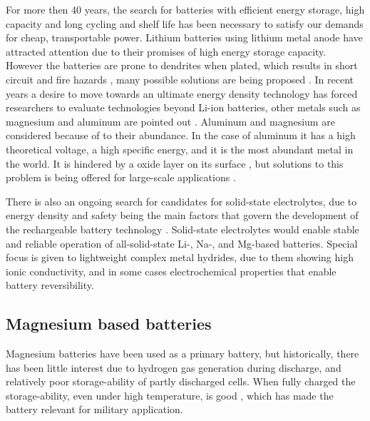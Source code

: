 For more then 40 years, the search for batteries with efficient energy storage, high capacity and long cycling and shelf life has been necessary to satisfy our demands for cheap, transportable power. Lithium batteries using lithium metal anode have attracted attention due to their promises of high energy storage capacity. However the batteries are prone to dendrites when plated, which results in short circuit and fire hazards \cite{xu2004nonaqueous}\cite{kim2013metallic}, many possible solutions are being proposed \cite{liu2016lithium} \cite{zhang2015ex} \cite{li2018self} \cite{lee2017suppressing}. In recent years a desire to move towards an ultimate energy density technology has forced researchers to evaluate technologies beyond Li-ion batteries, other metals such as magnesium and aluminum are pointed out \cite{reddy2011linden} \cite{yoo2013mg}. Aluminum and magnesium are considered because of to their abundance. In the case of aluminum it has a high theoretical voltage, a high specific energy, and it is the most abundant metal in the world. It is hindered by a oxide layer on its surface \cite{li2002aluminum}, but solutions to this problem is being offered for large-scale applications \cite{van2014rechargeable}. 

There is also an ongoing search for candidates for solid-state electrolytes, due to energy density and safety being the main factors that govern the development of the rechargeable battery technology \cite{guzik2019lightweight}. Solid-state electrolytes would enable stable and reliable operation of all-solid-state Li-, Na-, and Mg-based batteries. Special focus is given to lightweight complex metal hydrides, due to them showing high ionic conductivity, and in some cases electrochemical properties that enable battery reversibility. 


\subsection{Magnesium based batteries}
	
	Magnesium batteries have been used as a primary battery, but historically, there has been little interest due to hydrogen gas generation during discharge, and relatively poor storage-ability of partly discharged cells. When fully charged the storage-ability, even under high temperature, is good \cite{reddy2011linden}, which has made the battery relevant for military application. 


